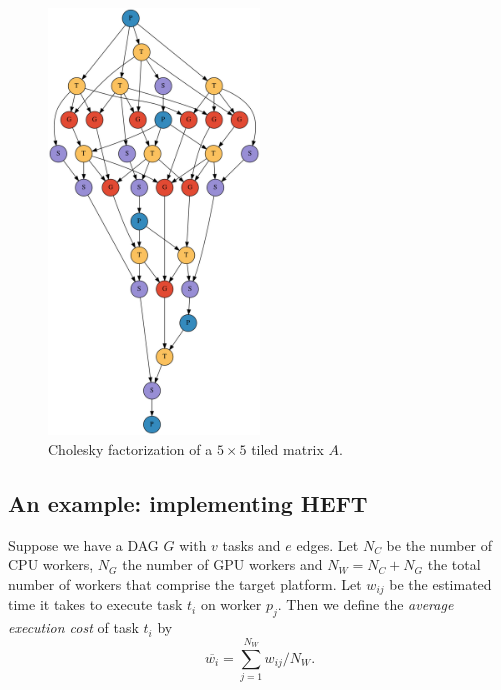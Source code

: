 \documentclass[runningheads]{llncs}
\begin{document}
\begin{figure}
	\centering	
	\includegraphics[width=0.5\textwidth]{Cholesky_35tasks_DAG.png}		
	\caption{Cholesky factorization of a $5 \times 5$ tiled matrix $A$. }
	\label{plot.Cholesky_DAG}	
\end{figure}  


\subsection{An example: implementing HEFT}
\label{subsect.implementing_HEFT}

Suppose we have a DAG $G$ with $v$ tasks and $e$ edges. Let $N_C$ be the number of CPU workers, $N_G$ the number of GPU workers and $N_W = N_C + N_G$ the total number of workers that comprise the target platform. Let $w_{ij}$ be the estimated time it takes to execute task $t_i$ on worker $p_j$. Then we define the {\em average execution cost} of task $t_i$ by
\begin{equation}
\label{eq.avg_weight}
\overline{w_i} = \sum_{j = 1}^{N_W} w_{ij} / N_W.
\end{equation}  
\end{document}
